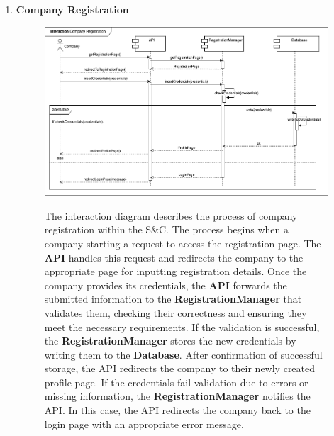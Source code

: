 \begin{enumerate}
    \newpage
    \item \textbf{Company Registration}
    \begin{figure}[h!]
            \centering  \includegraphics[width=1\textwidth]{DD/Images/Interactions/INT08_CompanyRegistration.drawio.png}
            \label{fig:ComponentViewDiagram}
            \caption*{The interaction diagram describes the process of company registration within the S\&C. The process begins when a company starting a request to access the registration page. The \textbf{API} handles this request and redirects the company to the appropriate page for inputting registration details. Once the company provides its credentials, the \textbf{API} forwards the submitted information to the \textbf{RegistrationManager} that validates them, checking their correctness and ensuring they meet the necessary requirements. If the validation is successful, the \textbf{RegistrationManager} stores the new credentials by writing them to the \textbf{Database}. After confirmation of successful storage, the API redirects the company to their newly created profile page. If the credentials fail validation due to errors or missing information, the \textbf{RegistrationManager} notifies the API. In this case, the API redirects the company back to the login page with an appropriate error message.
            }
    \end{figure}


\end{enumerate}
